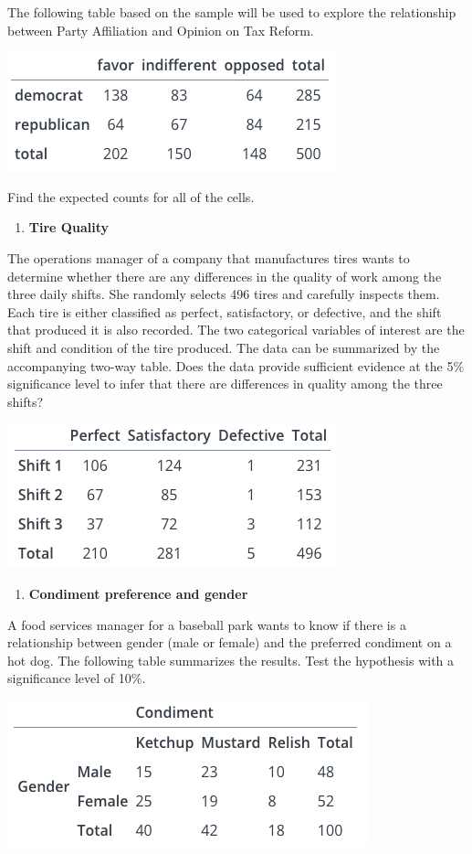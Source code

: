 \documentclass[
]{article}
\providecommand{\tightlist}{%
  \setlength{\itemsep}{0pt}\setlength{\parskip}{0pt}}
\begin{document}
The following table based on the sample will be used to explore the
relationship between Party Affiliation and Opinion on Tax Reform.

\begin{center}\includegraphics[width=0.35\linewidth]{week13/practiceEx02Data} \end{center}

Find the expected counts for all of the cells.

\begin{enumerate}
\def\labelenumi{\arabic{enumi}.}
\setcounter{enumi}{2}
\tightlist
\item
  \textbf{Tire Quality}
\end{enumerate}

The operations manager of a company that manufactures tires wants to
determine whether there are any differences in the quality of work among
the three daily shifts. She randomly selects 496 tires and carefully
inspects them. Each tire is either classified as perfect, satisfactory,
or defective, and the shift that produced it is also recorded. The two
categorical variables of interest are the shift and condition of the
tire produced. The data can be summarized by the accompanying two-way
table. Does the data provide sufficient evidence at the 5\% significance
level to infer that there are differences in quality among the three
shifts?

\begin{center}\includegraphics[width=0.35\linewidth]{week13/practiceEx03Data} \end{center}

\begin{enumerate}
\def\labelenumi{\arabic{enumi}.}
\setcounter{enumi}{3}
\tightlist
\item
  \textbf{Condiment preference and gender}
\end{enumerate}

A food services manager for a baseball park wants to know if there is a
relationship between gender (male or female) and the preferred condiment
on a hot dog. The following table summarizes the results. Test the
hypothesis with a significance level of 10\%.

\begin{center}\includegraphics[width=0.35\linewidth]{week13/practiceEx04Data} \end{center}
\end{document}
